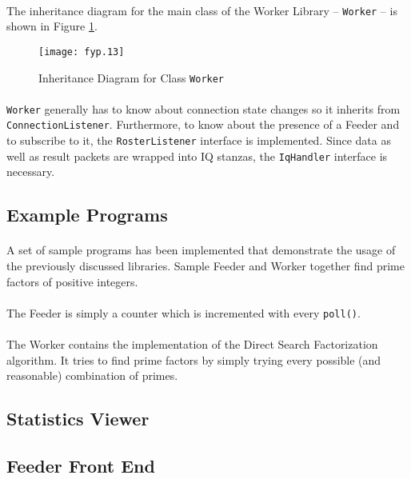 \paragraph{}
The inheritance diagram for the main class of the Worker Library -- \texttt{Worker} -- is shown in Figure \ref{fig:inhworker}.

\begin{figure}[H]
\begin{center}
\texttt{[image: fyp.13]}
\end{center}
\caption{Inheritance Diagram for Class \texttt{Worker}}
\label{fig:inhworker}
\end{figure}

\paragraph{}
\texttt{Worker} generally has to know about connection state changes so it inherits from \texttt{ConnectionListener}. Furthermore, to know about the presence of a Feeder and to subscribe to it, the \texttt{RosterListener} interface is implemented. Since data as well as result packets are wrapped into IQ stanzas, the \texttt{IqHandler} interface is necessary.


\subsection{Example Programs}
\label{sec:samples}
\paragraph{}
A set of sample programs has been implemented that demonstrate the usage of the previously discussed libraries. Sample Feeder and Worker together find prime factors of positive integers.

\paragraph{}
The Feeder is simply a counter which is incremented with every \texttt{poll()}.

\paragraph{}
The Worker contains the implementation of the Direct Search Factorization algorithm. It tries to find prime factors by simply trying every possible (and reasonable) combination of primes.

\subsection{Statistics Viewer}
\paragraph{}

\subsection{Feeder Front End}
\paragraph{}
